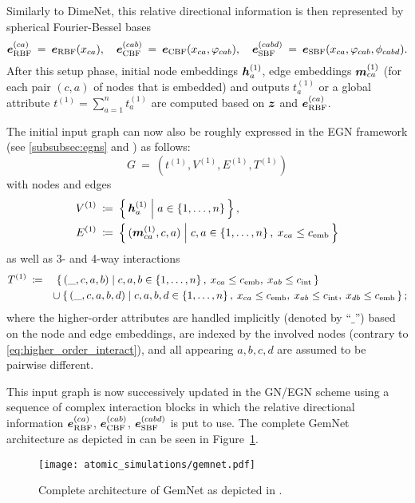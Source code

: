 Similarly to DimeNet, this relative directional information is then represented 
by spherical Fourier-Bessel bases
\[
    \boldsymbol{e}_{\text{RBF}}^{(ca)} \: = \: \boldsymbol{e}_{\text{RBF}}(x_{ca}), 
    \quad \boldsymbol{e}_{\text{CBF}}^{(cab)} \: = \: \boldsymbol{e}_{\text{CBF}}(x_{ca}, \varphi_{cab}),
    \quad \boldsymbol{e}_{\text{SBF}}^{(cabd)} \: = \: \boldsymbol{e}_{\text{SBF}}(x_{ca}, \varphi_{cab}, \phi_{cabd}) 
    \text{.}
\]
After this setup phase, initial node embeddings $\boldsymbol{h}_{a}^{(1)}$, edge embeddings 
$\boldsymbol{m}_{ca}^{(1)}$ (for each pair $(c, a)$ of nodes that is embedded) and outputs
$t_{a}^{(1)}$ or a global attribute $t^{(1)} = \sum_{a=1}^n t_a^{(1)}$
are computed based on $\boldsymbol{z}$ and $\boldsymbol{e}_{\text{RBF}}^{(ca)}$. 

The initial input graph can now also be roughly expressed in the
EGN framework (see \ref{subsubsec:egns} and 
\cite{https://doi.org/10.48550/arxiv.2203.09697}) as follows:
\[
    G \: = \: (t^{(1)}, V^{(1)}, E^{(1)}, T^{(1)})
\]
with nodes and edges
\begin{align*}
    V^{(1)} \: &\coloneqq \: \left\{\, \boldsymbol{h}_{a}^{(1)} \; \middle| \; a \in \left\{1, \dots, n\right\} \,\right\}, \\
    E^{(1)} \: &\coloneqq \: \left\{\, (\boldsymbol{m}_{ca}^{(1)}, c, a) \; \middle| \; c, a \in \left\{1, \dots, n\right\}, \: x_{ca} \leq c_{\text{emb}} \,\right\}
\end{align*}
as well as 3- and 4-way interactions
\begin{align*}
    T^{(1)} \: &\coloneqq \quad \left\{\, (\_, c, a, b) \; \middle| \; c, a, b \in \left\{1, \dots, n\right\}, \: x_{ca} \leq c_{\text{emb}}, \: x_{ab} \leq c_{\text{int}} \,\right\} \\
    &\qquad \cup  \left\{\, (\_, c, a, b, d) \; \middle| \; c, a, b, d \in \left\{1, \dots, n\right\}, \: x_{ca} \leq c_{\text{emb}}, \: x_{ab} \leq c_{\text{int}}, \: x_{db} \leq c_{\text{emb}} \,\right\};
\end{align*}
where the higher-order attributes are handled implicitly (denoted by \enquote{$\_$}) 
based on the node and edge embeddings, are indexed by the involved nodes (contrary to \eqref{eq:higher_order_interact}),
 and all appearing $a, b, c, d$ are assumed to be 
pairwise different.

This input graph is now successively updated in the GN/EGN scheme using a sequence of complex interaction
blocks in which the relative directional information 
$\boldsymbol{e}_{\text{RBF}}^{(ca)}$, $\boldsymbol{e}_{\text{CBF}}^{(cab)}$, $\boldsymbol{e}_{\text{SBF}}^{(cabd)}$ is put to use. 
The complete GemNet architecture as depicted in 
\cite{https://doi.org/10.48550/arxiv.2106.08903} can be seen in Figure~\ref{fig:gemnet}.

\begin{figure}[H]
    \centering
    \texttt{[image: atomic\_simulations/gemnet.pdf]}
    \caption{Complete architecture of GemNet as depicted in \cite[Appendix F]{https://doi.org/10.48550/arxiv.2106.08903}.}
    \label{fig:gemnet}
\end{figure}
